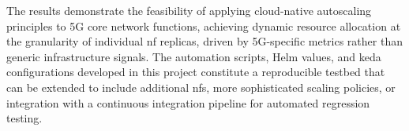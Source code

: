 The results demonstrate the feasibility of applying cloud-native autoscaling principles to 5G core network functions, achieving dynamic resource allocation at the granularity of individual \gls{nf} replicas, driven by 5G-specific metrics rather than generic infrastructure signals. The automation scripts, Helm values, and \gls{keda} configurations developed in this project constitute a reproducible testbed that can be extended to include additional \glspl{nf}, more sophisticated scaling policies, or integration with a continuous integration pipeline for automated regression testing.

%
%
%
%
%
%
%
%
%
%
%
